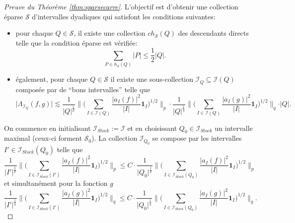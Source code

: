\documentclass[11pt]{amsart}
\newcommand{\one}{\mathbf{1}}
\newcommand{\ii}{\mathscr}
\newcommand{\ic}{\mathcal}
\newcommand{\comment}[1]{\vskip.3cm
\fbox{%
\parbox{0.93\linewidth}{\footnotesize #1}}
\vskip.3cm}
\begin{document}
\begin{proof}[Preuve du Th\'eor\`eme \ref{thm:sparsecarre}]
L'objectif est d'obtenir une collection \'eparse $\ic S$ d'intervalles dyadiques qui satisfont les conditions suivantes:
\begin{itemize}
\item pour chaque $Q \in \ic S$, il existe une collection $ch_{\ic S}(Q)$ des descendants directs telle que la condition \'eparse est v\'erifi\'ee: 
\[
\sum_{P \in h_{\ic S}(Q)} \vert P \vert \leq \frac{1}{2} \vert Q \vert.
\]
\item \'egalement, pour chaque $Q \in \ic S$ il existe une sous-collection $\ii I_Q \subseteq \ii I(Q)$ compos\'ee par de ``bons intervalles'' telle que 
\[
\vert\Lambda_{\ii I_Q}(f, g)\vert \lesssim \frac{1}{\vert Q \vert^{\frac{1}{p}}} \big\|  \Big( \sum_{ I \in \ii I(Q)}  \frac{\vert a_I(f) \vert^2}{\vert I \vert}  \one_I \Big)^{1/2}   \big\|_{p} \cdot \frac{1}{\vert Q \vert^{\frac{1}{q}}} \big\|  \Big( \sum_{ I \in \ii I(Q)} \frac{\vert a_I(g) \vert^2}{\vert I \vert}  \one_I \Big)^{1/2}   \big\|_{q} \cdot \vert Q  \vert.
\]
\end{itemize}

On commence en initialisant $\ii I_{Stock}:=\ii I$ et en choisissant $Q_0 \in \ii I_{Stock}$ un intervalle maximal (ceux-ci forment $\ic S_0$). La collection $\ii I_{Q_0}$ se compose par les intervalles $I' \in \ii I_{Stock}(Q_0)$ telle que
\begin{equation}
\label{eq:constraint-f}
\frac{1}{\vert I' \vert^{\frac{1}{p}}} \big\|  \Big( \sum_{ I \in \ii I_{Stock}(I')}  \frac{\vert a_I(f) \vert^2}{\vert I \vert}  \one_I \Big)^{1/2}   \big\|_{p} \leq C \cdot \frac{1}{\vert Q_0 \vert^{\frac{1}{p}}} \big\|  \Big( \sum_{ I \in \ii I_{Stock}(Q_0)}  \frac{\vert a_I(f) \vert^2}{\vert I \vert}  \one_I \Big)^{1/2}   \big\|_{p}
\end{equation}
et simultan\'ement pour la fonction $g$
\begin{equation}
\label{eq:constraint-g}
\frac{1}{\vert I' \vert^{\frac{1}{q}}} \big\|  \Big( \sum_{ I \in \ii I_{Stock}(I')}  \frac{\vert a_I(g) \vert^2}{\vert I \vert}  \one_I \Big)^{1/2}   \big\|_{q} \leq C \cdot \frac{1}{\vert Q_0 \vert^{\frac{1}{q}}} \big\|  \Big( \sum_{ I \in \ii I_{Stock}(Q_0)}  \frac{\vert a_I(g) \vert^2}{\vert I \vert}  \one_I \Big)^{1/2}   \big\|_{q}.
\end{equation}


\end{proof}
\end{document}
